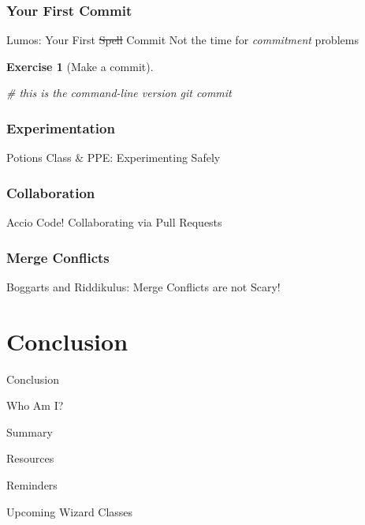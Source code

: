 \documentclass{beamer}
\theoremstyle{example}
\newtheorem{exercise}{Exercise}
\begin{document}
\section{Your First Commit}
\begin{frame}[fragile]{Lumos: Your First \sout{Spell} Commit}
    Not the time for \emph{commitment} problems
    \begin{exercise}[Make a commit]
        \begin{shell}
# this is the command-line version
git commit
        \end{shell}
    \end{exercise}
\end{frame}

\section{Experimentation}
\begin{frame}{Potions Class \& PPE\@: Experimenting Safely}
\end{frame}

\section{Collaboration}
\begin{frame}{Accio Code! Collaborating via Pull Requests}
\end{frame}

\section{{\textdagger}Merge Conflicts{\textdagger}}
\begin{frame}{Boggarts and Riddikulus: Merge Conflicts are \alert{not} Scary!}
\end{frame}

\part{Conclusion}
\begin{frame}{Conclusion}
    \begin{block}{Who Am I?}
    \end{block}
    \begin{block}{Summary}
    \end{block}
    \begin{block}{Resources}
    \end{block}
    \begin{block}{Reminders}
    \end{block}
    \begin{block}{Upcoming Wizard Classes}
    \end{block}
\end{frame}

\end{document}
